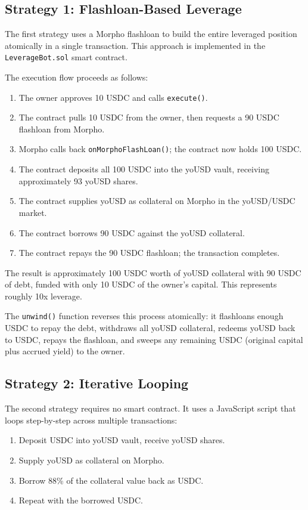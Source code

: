 \subsection{Strategy 1: Flashloan-Based Leverage}

The first strategy uses a Morpho flashloan to build the entire leveraged position atomically in a single transaction. This approach is implemented in the \texttt{LeverageBot.sol} smart contract.

The execution flow proceeds as follows:
\begin{enumerate}
    \item The owner approves 10 USDC and calls \texttt{execute()}.
    \item The contract pulls 10 USDC from the owner, then requests a 90 USDC flashloan from Morpho.
    \item Morpho calls back \texttt{onMorphoFlashLoan()}; the contract now holds 100 USDC.
    \item The contract deposits all 100 USDC into the yoUSD vault, receiving approximately 93 yoUSD shares.
    \item The contract supplies yoUSD as collateral on Morpho in the yoUSD/USDC market.
    \item The contract borrows 90 USDC against the yoUSD collateral.
    \item The contract repays the 90 USDC flashloan; the transaction completes.
\end{enumerate}

The result is approximately 100 USDC worth of yoUSD collateral with 90 USDC of debt, funded with only 10 USDC of the owner's capital. This represents roughly 10x leverage.

The \texttt{unwind()} function reverses this process atomically: it flashloans enough USDC to repay the debt, withdraws all yoUSD collateral, redeems yoUSD back to USDC, repays the flashloan, and sweeps any remaining USDC (original capital plus accrued yield) to the owner.

\subsection{Strategy 2: Iterative Looping}

The second strategy requires no smart contract. It uses a JavaScript script that loops step-by-step across multiple transactions:
\begin{enumerate}
    \item Deposit USDC into yoUSD vault, receive yoUSD shares.
    \item Supply yoUSD as collateral on Morpho.
    \item Borrow 88\% of the collateral value back as USDC.
    \item Repeat with the borrowed USDC.
\end{enumerate}

